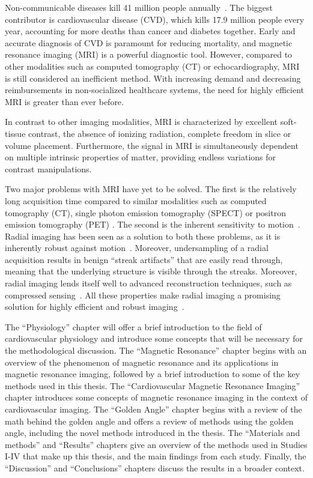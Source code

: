 Non-communicable diseases kill 41 million people annually~\cite{WHO2013}. The biggest contributor is cardiovascular disease (CVD), which kills 17.9 million people every year, accounting for more deaths than cancer and diabetes together. Early and accurate diagnosis of CVD is paramount for reducing mortality, and magnetic resonance imaging (MRI) is a powerful diagnostic tool. However, compared to other modalities such as computed tomography (CT) or echocardiography, MRI is still considered an inefficient method. With increasing demand and decreasing reimbursements in non-socialized healthcare systems, the need for highly efficient MRI is greater than ever before.

In contrast to other imaging modalities, MRI is characterized by excellent soft-tissue contrast, the absence of ionizing radiation, complete freedom in slice or volume placement. Furthermore, the signal in MRI is simultaneously dependent on multiple intrinsic properties of matter, providing endless variations for contrast manipulations.

Two major problems with MRI have yet to be solved. The first is the relatively long acquisition time compared to similar modalities such as computed tomography (CT),  single photon emission tomography (SPECT)  or positron emission tomography (PET) . The second is the inherent sensitivity to motion~\cite{Wood1985}. Radial imaging has been seen as a solution to both these problems, as it is inherently robust against motion~\cite{Glover1992}. Moreover, undersampling of a radial acquisition results in benign ``streak artifacts'' that are easily read through, meaning that the underlying structure is visible through the streaks. Moreover, radial imaging lends itself well to advanced reconstruction techniques, such as compressed sensing~\cite{Lustig2007}. All these properties make radial imaging a promising solution for highly efficient and robust imaging~\cite{Block2014}.


The ``Physiology'' chapter will offer a brief introduction to the field of cardiovascular physiology and introduce some concepts that will be necessary for the methodological discussion. The ``Magnetic Resonance'' chapter begins with an overview of the phenomenon of magnetic resonance and its applications in magnetic resonance imaging, followed by a brief introduction to some of the key methods used in this thesis. The ``Cardiovascular Magnetic Resonance Imaging'' chapter introduces some concepts of magnetic resonance imaging in the context of cardiovascular imaging. The ``Golden Angle'' chapter begins with a review of the math behind the golden angle and offers a review of methods using the golden angle, including the novel methods introduced in the thesis. The ``Materials and methods'' and ``Results'' chapters give an overview of the methods used in Studies I-IV that make up this thesis, and the main findings from each study. Finally, the ``Discussion'' and ``Conclusions'' chapters discuss the results in a broader context.